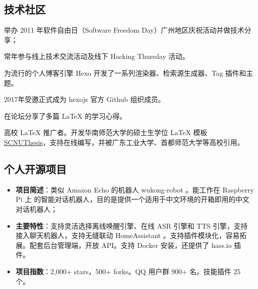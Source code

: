 \newpage

\subsection{\hei 技术社区}

{
  \begin{tightitemize}%
  \item 举办 2011 年软件自由日（Software Freedom Day）广州地区庆祝活动并做技术分享；
  \item 常年参与线上技术交流活动及线下 Hacking Thursday 活动。
  \end{tightitemize}}

{
  \begin{tightitemize}%
  \item 为流行的个人博客引擎 Hexo 开发了一系列渲染器、检索源生成器、Tag 插件和主题。
  \item 2017年受邀正式成为 hexojs 官方 Github 组织成员。
  \end{tightitemize}}

{
  \begin{tightitemize}%
  \item 在论坛分享了多篇 \LaTeX{} 的学习心得。
  \item 高校 \LaTeX{} 推广者。开发华南师范大学的硕士生学位 \LaTeX{} 模板
    \href{https://github.com/scnu/scnuthesis}{SCNUThesis}，支持在线编写，并被广东工业大学、首都师范大学等高校引用。
  \end{tightitemize}}

\subsection{\hei 个人开源项目}

%
  {
\begin{itemize}
\item \textbf{项目简述}：类似 Amazon Echo 的机器人 wukong-robot 。能工作在 Raspberry Pi 上
  的智能对话机器人，目的是提供一个适用于中文环境的开箱即用的中文对话机器人；
\item \textbf{主要特性}：支持灵活选择离线唤醒引擎、在线 ASR 引擎和 TTS 引擎，支持
  接入聊天机器人，支持无缝联动 HomeAssistant 。支持插件模块化，容易拓展。配套后台管理端，开放 API。支持 Docker 安装，还提供了 hass.io 插件。
\item \textbf{项目指数}：2,000+ stars，500+ forks。QQ 用户群 900+ 名。技能插件 25 个。
\end{itemize}}


